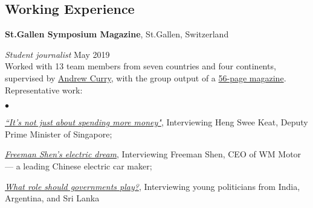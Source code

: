 \documentclass[margin,line, 10pt]{res}
\newenvironment{list2}{
  \begin{list}{$\bullet$}{%
      \setlength{\itemsep}{0in}
      \setlength{\parsep}{0in} \setlength{\parskip}{0in}
      \setlength{\topsep}{0in} \setlength{\partopsep}{0in} 
      \setlength{\leftmargin}{0.2in}}}{\end{list}}
\begin{document}
\begin{resume}
\section{\sc Working Experience}
{\bf St.Gallen Symposium Magazine}, St.Gallen, Switzerland

\vspace{-.3cm}
{\em Student journalist} \hfill {May 2019}\\
Worked with 13 team members from seven countries and four continents, supervised by \href{https://www.andrewcurry.com/}{Andrew Curry}, with the group output of a \href{https://www.symposium.org/sites/default/files/2019-11/Magazine\%2049th\%20St.\%20Gallen\%20Symposium.pdf}{56-page magazine}. Representative work:

\begin{list2}
\item {\href{https://www.symposium.org/articles/its-not-just-about-spending-more-money}{\textit{``It's not just about spending more money"}}, Interviewing Heng Swee Keat, Deputy Prime Minister of Singapore;}
\item {\href{https://www.symposium.org/articles/freeman-shens-electric-dream}{\textit{Freeman Shen's electric dream}}, Interviewing Freeman Shen, CEO of WM Motor --- a leading Chinese electric car maker;}
\item {\href{https://www.symposium.org/articles/what-role-should-governments-play}{\textit{What role should governments play?}}, Interviewing young politicians from India, Argentina, and Sri Lanka}
\end{list2}






\end{resume}
\end{document}
